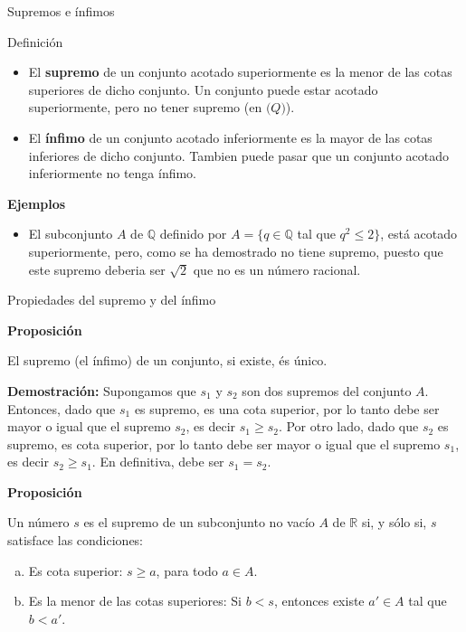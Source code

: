 \documentclass[
  ignorenonframetext,
]{beamer}
\providecommand{\tightlist}{%
  \setlength{\itemsep}{0pt}\setlength{\parskip}{0pt}}
\begin{document}
\begin{frame}{Supremos e ínfimos}
\protect\hypertarget{supremos-e-uxednfimos}{}

Definición

\begin{itemize}
\item
  El \textbf{supremo} de un conjunto acotado superiormente es la menor
  de las cotas superiores de dicho conjunto. Un conjunto puede estar
  acotado superiormente, pero no tener supremo (en \(\mathbb(Q)\)).
\item
  El \textbf{ínfimo} de un conjunto acotado inferiormente es la mayor de
  las cotas inferiores de dicho conjunto. Tambien puede pasar que un
  conjunto acotado inferiormente no tenga ínfimo.
\end{itemize}

\textbf{Ejemplos}

\begin{itemize}
\tightlist
\item
  El subconjunto \(A\) de \(\mathbb{Q}\) definido por
  \(A =\{q \in \mathbb{Q}\) tal que \(q^2 \leq 2 \}\), está acotado
  superiormente, pero, como se ha demostrado no tiene supremo, puesto
  que este supremo deberia ser \(\sqrt{2}\) que no es un número
  racional.
\end{itemize}

\end{frame}

\begin{frame}{Propiedades del supremo y del ínfimo}
\protect\hypertarget{propiedades-del-supremo-y-del-uxednfimo}{}

\textbf{Proposición}

El supremo (el ínfimo) de un conjunto, si existe, és único.

\textbf{Demostración:} Supongamos que \(s_1\) y \(s_2\) son dos supremos
del conjunto \(A\). Entonces, dado que \(s_1\) es supremo, es una cota
superior, por lo tanto debe ser mayor o igual que el supremo \(s_2\), es
decir \(s_1 \geq s_2\). Por otro lado, dado que \(s_2\) es supremo, es
cota superior, por lo tanto debe ser mayor o igual que el supremo
\(s_1\), es decir \(s_2 \geq s_1\). En definitiva, debe ser \(s_1=s_2\).

\textbf{Proposición}

Un número \(s\) es el supremo de un subconjunto no vacío \(A\) de
\(\mathbb{R}\) si, y sólo si, \(s\) satisface las condiciones:

\begin{enumerate}
[a)]
\item
  Es cota superior: \(s\geq a\), para todo \(a \in A\).
\item
  Es la menor de las cotas superiores: Si \(b < s\), entonces existe
  \(a' \in A\) tal que \(b<a'\).
\end{enumerate}

\end{frame}
\end{document}
